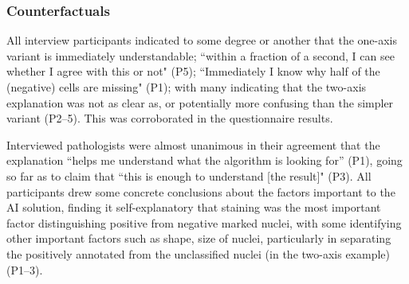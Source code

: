 
\subsubsection{Counterfactuals}

All interview participants indicated to some degree or another that the one-axis variant is immediately understandable; ``within a fraction of a second, I can see whether I agree with this or not" (P5); ``Immediately I know why half of the (negative) cells are missing" (P1); with many indicating that the two-axis explanation was not as clear as, or potentially more confusing than the simpler variant (P2--5). This was corroborated in the questionnaire results.


Interviewed pathologists were almost unanimous in their agreement that the explanation ``helps me understand what the algorithm is looking for” (P1), going so far as to claim that ``this is enough to understand [the result]" (P3). All participants drew some concrete conclusions about the factors important to the AI solution, finding it self-explanatory that staining was the most important factor distinguishing positive from negative marked nuclei, with some identifying other important factors such as shape, size of nuclei, particularly in separating the positively annotated from the unclassified nuclei (in the two-axis example) (P1--3).



